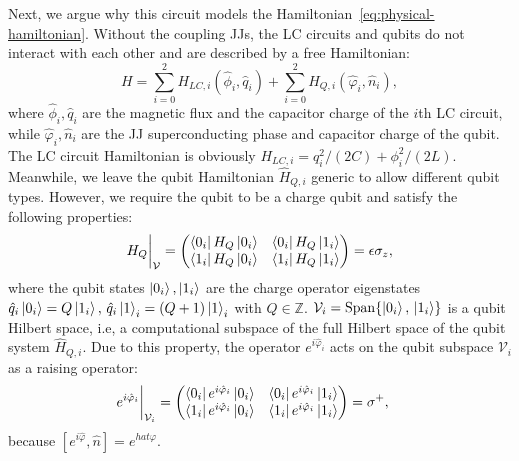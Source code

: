 \documentclass[reprint, aps, prx, amsmath, amssymb, longbibliography, superscriptaddress]{revtex4-2}
\begin{document}
Next, we argue why this circuit models the Hamiltonian~\eqref{eq:physical-hamiltonian}. Without the coupling JJs, the LC circuits and qubits do not interact with each other and are described by a free Hamiltonian:
\begin{equation}
    H = \sum_{i = 0}^2  H_{LC, i}(\hat \phi_i, \hat q_i) + \sum_{i = 0}^2 H_{Q,i}(\hat \varphi_i, \hat n_i),
\end{equation}
where $ \hat\phi_i, \hat q_i$ are the magnetic flux and the capacitor charge of the $i$th LC circuit, while $\hat \varphi_i, \hat n_i$ are the JJ superconducting phase and capacitor charge of the qubit. The LC circuit Hamiltonian is obviously $ H_{LC, i} = q_i^2/(2C) + \phi_i^2/(2L)$. Meanwhile, we leave the qubit Hamiltonian $\hat H_{Q,i} $ generic to allow different qubit types. However, we require the qubit to be a charge qubit and satisfy the following properties:
\begin{align}
   H_{Q}\bigg|_{\mathcal{V}} = \begin{pmatrix} \bra{0_i} H_Q\ket{0_i} & \bra{0_i} H_Q \ket{1_i} \\ \bra{1_i} H_Q \ket{0_i} & \bra{1_i} H_Q \ket{1_i} \end{pmatrix} = \epsilon \sigma_z,
\end{align}
where the qubit states $\ket{0_i},\ket{1_i}$ are the charge operator eigenstates $ \hat q_i \ket{0_i} = Q \ket{1_i}, \, \hat q_{i} \ket{1}_i = (Q+1)\ket{1}_i$ with $ Q \in \mathbb{Z}$. $\mathcal{V}_i = \operatorname{Span}\{\ket{0_i},\, \ket{1_i}\}$ is a qubit Hilbert space, i.e, a computational subspace of the full Hilbert space of the qubit system $ \hat H_{Q,i}$. Due to this property, the operator $ e^{i\hat \varphi_i} $ acts on the qubit subspace $\mathcal{V}_i$ as a raising operator:
\begin{equation}
  \begin{aligned}
    &e^{i\hat\varphi_i}\bigg|_{\mathcal{V}_i} = \begin{pmatrix} \bra{0_i} e^{i\hat\varphi_i} \ket{0_i} & \bra{0_i} e^{i\hat\varphi_i} \ket{1_i} \\ \bra{1_i} e^{i\hat\varphi_i} \ket{0_i} & \bra{1_i} e^{i\hat\varphi_i} \ket{1_i} \end{pmatrix} = \sigma^+,
  \end{aligned}
\end{equation}
because $[e^{i\hat \varphi}, \hat n] = e^{hat \varphi}$.
\end{document}
